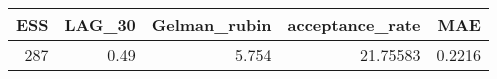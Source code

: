 \begin{longtable}{rrrrr}
\toprule
ESS & LAG\_30 & Gelman\_rubin & acceptance\_rate & MAE \\ 
\midrule
287 & 0.49 & 5.754 & 21.75583 & 0.2216 \\ 
\bottomrule
\end{longtable}

